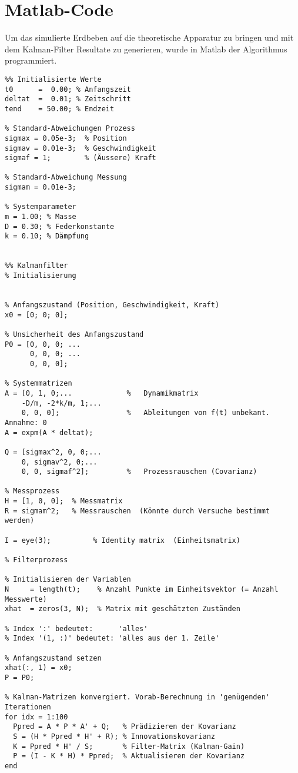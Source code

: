 \section{Matlab-Code}
Um das simulierte Erdbeben auf die theoretische Apparatur zu bringen und mit dem Kalman-Filter Resultate zu generieren, wurde in Matlab der Algorithmus programmiert. 
\begin{lstlisting}
%% Initialisierte Werte
t0      =  0.00; % Anfangszeit
deltat  =  0.01; % Zeitschritt
tend    = 50.00; % Endzeit

% Standard-Abweichungen Prozess
sigmax = 0.05e-3;  % Position
sigmav = 0.01e-3;  % Geschwindigkeit
sigmaf = 1;        % (Äussere) Kraft

% Standard-Abweichung Messung
sigmam = 0.01e-3;

% Systemparameter
m = 1.00; % Masse
D = 0.30; % Federkonstante
k = 0.10; % Dämpfung


%% Kalmanfilter
% Initialisierung


% Anfangszustand (Position, Geschwindigkeit, Kraft)
x0 = [0; 0; 0];

% Unsicherheit des Anfangszustand
P0 = [0, 0, 0; ...
      0, 0, 0; ...
      0, 0, 0];

% Systemmatrizen
A = [0, 1, 0;...             %   Dynamikmatrix
    -D/m, -2*k/m, 1;...      
    0, 0, 0];                %   Ableitungen von f(t) unbekant. Annahme: 0
A = expm(A * deltat);

Q = [sigmax^2, 0, 0;...      
    0, sigmav^2, 0;...
    0, 0, sigmaf^2];         %   Prozessrauschen (Covarianz)

% Messprozess
H = [1, 0, 0];  % Messmatrix
R = sigmam^2;   % Messrauschen  (Könnte durch Versuche bestimmt werden)

I = eye(3);          % Identity matrix  (Einheitsmatrix)

% Filterprozess

% Initialisieren der Variablen
N     = length(t);    % Anzahl Punkte im Einheitsvektor (= Anzahl Messwerte)
xhat  = zeros(3, N);  % Matrix mit geschätzten Zuständen

% Index ':' bedeutet:      'alles'
% Index '(1, :)' bedeutet: 'alles aus der 1. Zeile'

% Anfangszustand setzen
xhat(:, 1) = x0; 
P = P0;

% Kalman-Matrizen konvergiert. Vorab-Berechnung in 'genügenden' Iterationen
for idx = 1:100
  Ppred = A * P * A' + Q;   % Prädizieren der Kovarianz
  S = (H * Ppred * H' + R); % Innovationskovarianz
  K = Ppred * H' / S;       % Filter-Matrix (Kalman-Gain)
  P = (I - K * H) * Ppred;  % Aktualisieren der Kovarianz  
end


\end{lstlisting}
